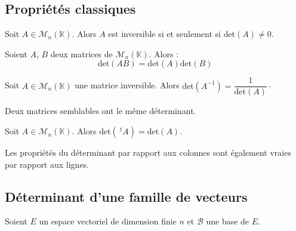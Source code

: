 \documentclass[a4paper,10pt]{report}
\begin{document}
\subsection{Propriétés classiques}

\begin{prop} Soit $A \in \mathcal{M}_n(\mathbb{K})$. Alors $A$ est inversible si et seulement si $\textrm{det}(A) \neq 0$.
\end{prop}

\begin{prop} Soient $A$, $B$ deux matrices de $\mathcal{M}_n(\mathbb{K})$. Alors :
$$ \textrm{det}(AB) = \textrm{det}(A) \textrm{det}(B)$$
\end{prop}

\begin{cor} Soit $A \in \mathcal{M}_n(\mathbb{K})$ une matrice inversible. Alors $\textrm{det}(A^{-1}) = \dfrac{1}{\textrm{det}(A)}
\cdot$
\end{cor}

\begin{prop} Deux matrices semblables ont le même déterminant.
\end{prop}

\begin{preuve} 
\vspace{4cm}
\end{preuve}

\begin{prop} Soit $A \in \mathcal{M}_n(\mathbb{K})$. Alors $\textrm{det}(~^tA) = \textrm{det}(A)$.
\end{prop}

\begin{cor} Les propriétés du déterminant par rapport aux colonnes sont également vraies par rapport aux lignes.
\end{cor}

\subsection{Déterminant d'une famille de vecteurs}

\noindent Soient $E$ un espace vectoriel de dimension finie $n$ et $\mathcal{B}$ une base de $E$.
\end{document}
